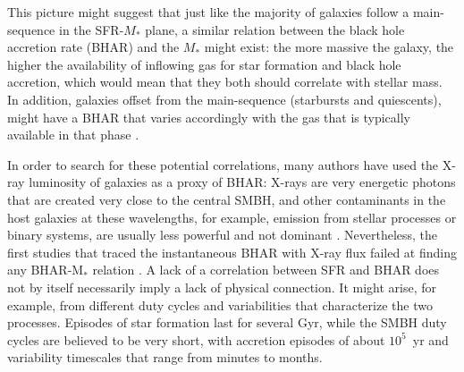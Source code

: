     This picture might suggest that just like the majority of galaxies follow a main-sequence in the SFR-$M_*$ plane, a similar relation between the black hole accretion rate (BHAR) and the $M_*$ might exist: the more massive the galaxy, the higher the availability of inflowing gas  for star formation and black hole accretion, which would mean that they both should correlate with stellar mass. In addition, galaxies offset from the main-sequence (starbursts and quiescents), might have a BHAR that varies accordingly with the gas that is typically available in that phase \citep{2019ApJ...877L..38R}. 
    
    In order to search for these potential correlations, many authors have used the X-ray luminosity of galaxies as a proxy of BHAR: X-rays are very energetic photons that are created very close to the central SMBH, and other contaminants in the host galaxies at these wavelengths, for example, emission from stellar processes or binary systems, are usually less powerful and not dominant \citep[see the review by][]{2015A&ARv..23....1B}. Nevertheless, the first studies that traced the instantaneous BHAR with X-ray flux failed at finding any BHAR-M$_*$ relation \citep{2009ApJ...696..396S, 2010A&A...518L..26S, 2012MNRAS.419...95M, 2012A&A...545A..45R, 2015ApJ...806..187A}. A lack of a correlation between SFR and BHAR does not by itself necessarily imply a lack of physical connection. It might arise, for example, from different duty cycles and variabilities that characterize the two processes.  
    Episodes of star formation last for several Gyr, while the SMBH duty cycles are believed to be very short, with accretion episodes of about $10^5$~yr and variability timescales that range from minutes to months.
    
